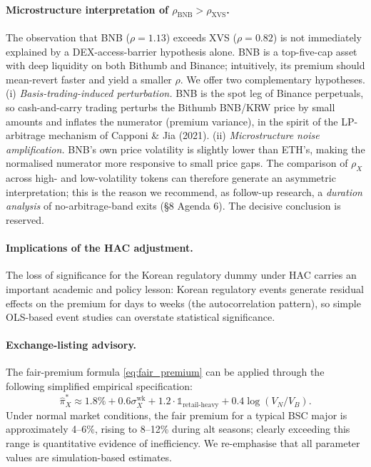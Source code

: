 \documentclass[11pt,a4paper]{article}
\begin{document}
\paragraph{Microstructure interpretation of $\rho_{\text{BNB}}>\rho_{\text{XVS}}$.}
The observation that BNB ($\rho=1.13$) exceeds XVS ($\rho=0.82$) is not immediately explained by
a DEX-access-barrier hypothesis alone. BNB is a top-five-cap asset with deep liquidity on both
Bithumb and Binance; intuitively, its premium should mean-revert faster and yield a smaller $\rho$.
We offer two complementary hypotheses. (i) \emph{Basis-trading-induced perturbation.} BNB is the
spot leg of Binance perpetuals, so cash-and-carry trading perturbs the Bithumb BNB/KRW price by
small amounts and inflates the numerator (premium variance), in the spirit of the LP-arbitrage
mechanism of Capponi \& Jia (2021). (ii) \emph{Microstructure noise amplification.} BNB's own
price volatility is slightly lower than ETH's, making the normalised numerator more responsive to
small price gaps. The comparison of $\rho_X$ across high- and low-volatility tokens can therefore
generate an asymmetric interpretation; this is the reason we recommend, as follow-up research, a
\emph{duration analysis} of no-arbitrage-band exits (\S 8 Agenda 6). The decisive conclusion is
reserved.

\paragraph{Implications of the HAC adjustment.}
The loss of significance for the Korean regulatory dummy under HAC carries an important
academic and policy lesson: Korean regulatory events generate residual effects on the premium for
days to weeks (the autocorrelation pattern), so simple OLS-based event studies can overstate
statistical significance.

\paragraph{Exchange-listing advisory.}
The fair-premium formula \eqref{eq:fair_premium} can be applied through the following simplified
empirical specification:
\begin{equation}
\hat{\pi}_X^* \approx 1.8\% + 0.6\sigma_X^{\text{wk}} + 1.2\cdot\mathbb{1}_{\text{retail-heavy}} + 0.4\log(V_N/V_B).
\end{equation}
Under normal market conditions, the fair premium for a typical BSC major is approximately
4--6\%, rising to 8--12\% during alt seasons; clearly exceeding this range is quantitative evidence
of inefficiency. We re-emphasise that all parameter values are simulation-based estimates.
\end{document}
